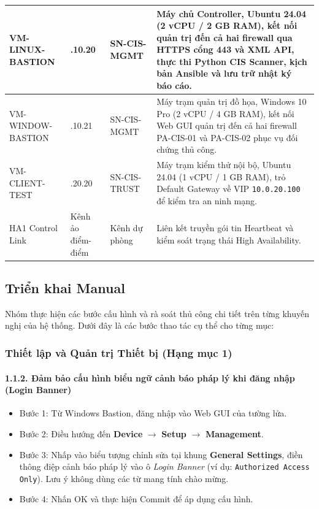 \documentclass[12pt,a4paper]{article}
\begin{document}
\begin{table}[H]
\begin{tabular}{|>{\raggedright\arraybackslash}p{2.8cm}|>{\raggedright\arraybackslash}p{3.2cm}|>{\raggedright\arraybackslash}p{2.6cm}|>{\raggedright\arraybackslash}p{6.4cm}|}
VM-LINUX-BASTION & 10.0.10.20 & SN-CIS-MGMT & Máy chủ Controller, Ubuntu 24.04 (2 vCPU / 2 GB RAM), kết nối quản trị đến cả hai firewall qua HTTPS cổng 443 và XML API, thực thi Python CIS Scanner, kịch bản Ansible và lưu trữ nhật ký báo cáo. \\ \hline
VM-WINDOW-BASTION & 10.0.10.21 & SN-CIS-MGMT & Máy trạm quản trị đồ họa, Windows 10 Pro (2 vCPU / 4 GB RAM), kết nối Web GUI quản trị đến cả hai firewall PA-CIS-01 và PA-CIS-02 phục vụ đối chứng thủ công. \\ \hline
VM-CLIENT-TEST & 10.0.20.20 & SN-CIS-TRUST & Máy trạm kiểm thử nội bộ, Ubuntu 24.04 (1 vCPU / 1 GB RAM), trỏ Default Gateway về VIP \texttt{10.0.20.100} để kiểm tra an ninh mạng. \\ \hline
HA1 Control Link & Kênh ảo điểm-điểm & Kênh dự phòng & Liên kết truyền gói tin Heartbeat và kiểm soát trạng thái High Availability. \\ \hline
\end{tabular}
\endgroup
\end{table}

\subsection{Triển khai Manual}

\noindent Nhóm thực hiện các bước cấu hình và rà soát thủ công chi tiết trên từng khuyến nghị của hệ thống. Dưới đây là các bước thao tác cụ thể cho từng mục:

\subsubsection{Thiết lập và Quản trị Thiết bị (Hạng mục 1)}

\paragraph{1.1.2. Đảm bảo cấu hình biểu ngữ cảnh báo pháp lý khi đăng nhập (Login Banner)}
\begin{itemize}
    \item Bước 1: Từ Windows Bastion, đăng nhập vào Web GUI của tường lửa.
    \item Bước 2: Điều hướng đến \textbf{Device} $\rightarrow$ \textbf{Setup} $\rightarrow$ \textbf{Management}.
    \item Bước 3: Nhấp vào biểu tượng chỉnh sửa tại khung \textbf{General Settings}, điền thông điệp cảnh báo pháp lý vào ô \textit{Login Banner} (ví dụ: \texttt{Authorized Access Only}). Lưu ý không dùng các từ mang tính chào mừng.
    \item Bước 4: Nhấn OK và thực hiện Commit để áp dụng cấu hình.
\end{itemize}
\end{document}
